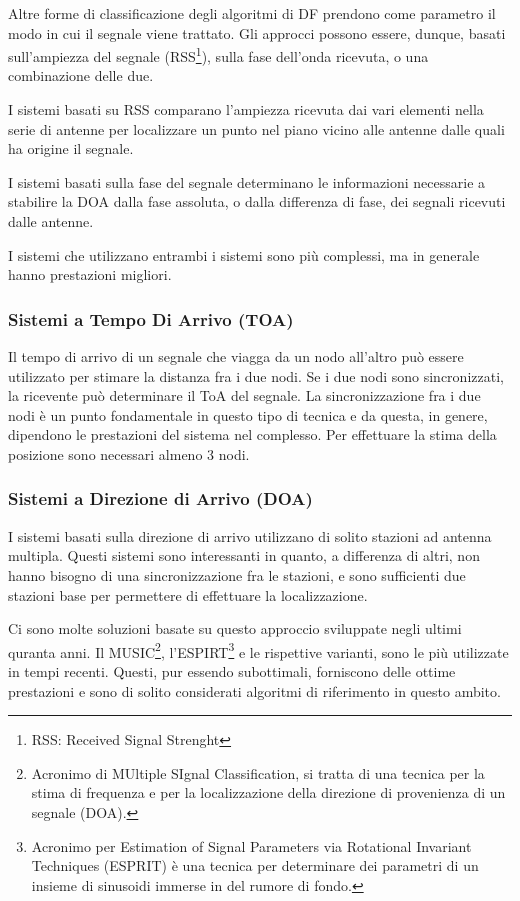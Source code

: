 Altre forme di classificazione degli algoritmi di DF prendono come parametro il modo in cui il segnale viene trattato. Gli approcci possono essere, dunque, basati sull'ampiezza del segnale (RSS\footnote{RSS: Received Signal Strenght}), sulla fase	dell'onda ricevuta, o una combinazione delle due. 

I sistemi basati su RSS comparano l'ampiezza ricevuta dai vari elementi nella serie di antenne per localizzare un punto nel piano vicino alle antenne dalle quali ha origine il segnale. 

I sistemi basati sulla fase del segnale determinano le informazioni necessarie a stabilire la DOA dalla fase assoluta, o dalla differenza di fase, dei segnali ricevuti dalle antenne. 

I sistemi che utilizzano entrambi i sistemi sono più complessi, ma in generale hanno prestazioni migliori.

\subsubsection{Sistemi a Tempo Di Arrivo (TOA)}

Il tempo di arrivo di un segnale che viagga da un nodo all'altro può essere utilizzato per stimare la distanza fra i due nodi. Se i due nodi sono sincronizzati, la ricevente può determinare il ToA del segnale. La sincronizzazione fra i due nodi è un punto fondamentale in questo tipo di tecnica e da questa, in genere, dipendono le prestazioni del sistema nel complesso. Per effettuare la stima della posizione sono necessari almeno 3 nodi.

\subsubsection{Sistemi a Direzione di Arrivo (DOA)}

I sistemi basati sulla direzione di arrivo utilizzano di solito stazioni ad antenna multipla. Questi sistemi sono interessanti in quanto, a differenza di altri, non hanno bisogno di una sincronizzazione fra le stazioni, e sono sufficienti due stazioni base per permettere	di effettuare la localizzazione. 

Ci sono molte soluzioni basate su questo approccio sviluppate negli ultimi quranta anni. Il MUSIC\footnote{Acronimo di MUltiple SIgnal Classification, si tratta di una tecnica per la stima di frequenza e per la localizzazione della direzione di provenienza di un segnale (DOA).}, l'ESPIRT\footnote{Acronimo per Estimation of Signal Parameters via Rotational Invariant Techniques (ESPRIT) è una tecnica per determinare dei parametri di un insieme di sinusoidi immerse in del rumore di fondo.} e le rispettive varianti, sono le più utilizzate in tempi recenti. Questi, pur essendo subottimali, forniscono delle ottime prestazioni e sono di solito considerati algoritmi di riferimento in questo ambito.

